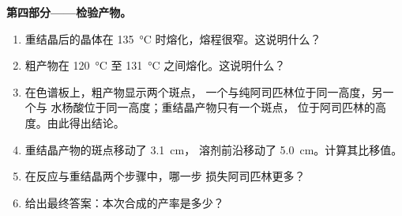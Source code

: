 \begin{problem}
\medskip
\noindent\textbf{第四部分——检验产物。}
\begin{enumerate}[resume]
  \item 重结晶后的晶体在 \qty{135}{\celsius}
        时熔化，熔程很窄。这说明什么？
  \item 粗产物在 \qty{120}{\celsius} 至
        \qty{131}{\celsius} 之间熔化。这说明什么？
  \item 在色谱板上，粗产物显示两个斑点，
        一个与纯阿司匹林位于同一高度，另一个与
        水杨酸位于同一高度；重结晶产物只有一个斑点，
        位于阿司匹林的高度。由此得出结论。
  \item 重结晶产物的斑点移动了 \qty{3.1}{cm}，
        溶剂前沿移动了 \qty{5.0}{cm}。计算其比移值。
  \item 在反应与重结晶两个步骤中，哪一步
        损失阿司匹林更多？
  \item 给出最终答案：本次合成的产率是多少？
\end{enumerate}
\end{problem}
